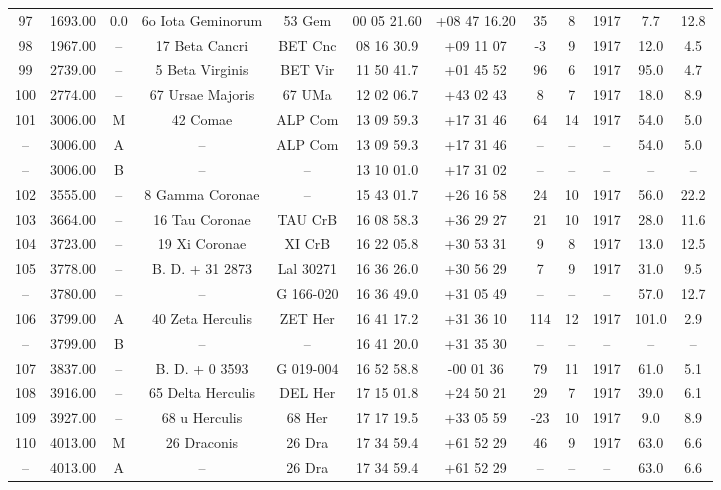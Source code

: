 \begin{table}
\begin{tabular}{cccccccccccc}
97 & 1693.00 & 0.0 & 6o Iota Geminorum & 53 Gem & 00 05 21.60 & +08 47 16.20 & 35 & 8 & 1917 & 7.7 & 12.8 \\
98 & 1967.00 & -- & 17 Beta Cancri & BET Cnc & 08 16 30.9 & +09 11 07 & -3 & 9 & 1917 & 12.0 & 4.5 \\
99 & 2739.00 & -- & 5 Beta Virginis & BET Vir & 11 50 41.7 & +01 45 52 & 96 & 6 & 1917 & 95.0 & 4.7 \\
100 & 2774.00 & -- & 67 Ursae Majoris & 67 UMa & 12 02 06.7 & +43 02 43 & 8 & 7 & 1917 & 18.0 & 8.9 \\
101 & 3006.00 & M & 42 Comae & ALP Com & 13 09 59.3 & +17 31 46 & 64 & 14 & 1917 & 54.0 & 5.0 \\
-- & 3006.00 & A & -- & ALP Com & 13 09 59.3 & +17 31 46 & -- & -- & -- & 54.0 & 5.0 \\
-- & 3006.00 & B & -- & -- & 13 10 01.0 & +17 31 02 & -- & -- & -- & -- & -- \\
102 & 3555.00 & -- & 8 Gamma Coronae & -- & 15 43 01.7 & +26 16 58 & 24 & 10 & 1917 & 56.0 & 22.2 \\
103 & 3664.00 & -- & 16 Tau Coronae & TAU CrB & 16 08 58.3 & +36 29 27 & 21 & 10 & 1917 & 28.0 & 11.6 \\
104 & 3723.00 & -- & 19 Xi Coronae & XI CrB & 16 22 05.8 & +30 53 31 & 9 & 8 & 1917 & 13.0 & 12.5 \\
105 & 3778.00 & -- & B. D. + 31  2873 & Lal 30271 & 16 36 26.0 & +30 56 29 & 7 & 9 & 1917 & 31.0 & 9.5 \\
-- & 3780.00 & -- & -- & G 166-020 & 16 36 49.0 & +31 05 49 & -- & -- & -- & 57.0 & 12.7 \\
106 & 3799.00 & A & 40 Zeta Herculis & ZET Her & 16 41 17.2 & +31 36 10 & 114 & 12 & 1917 & 101.0 & 2.9 \\
-- & 3799.00 & B & -- & -- & 16 41 20.0 & +31 35 30 & -- & -- & -- & -- & -- \\
107 & 3837.00 & -- & B. D. + 0  3593 & G 019-004 & 16 52 58.8 & -00 01 36 & 79 & 11 & 1917 & 61.0 & 5.1 \\
108 & 3916.00 & -- & 65 Delta Herculis & DEL Her & 17 15 01.8 & +24 50 21 & 29 & 7 & 1917 & 39.0 & 6.1 \\
109 & 3927.00 & -- & 68 u Herculis & 68 Her & 17 17 19.5 & +33 05 59 & -23 & 10 & 1917 & 9.0 & 8.9 \\
110 & 4013.00 & M & 26 Draconis & 26 Dra & 17 34 59.4 & +61 52 29 & 46 & 9 & 1917 & 63.0 & 6.6 \\
-- & 4013.00 & A & -- & 26 Dra & 17 34 59.4 & +61 52 29 & -- & -- & -- & 63.0 & 6.6 \\

\end{tabular}
\end{table}

